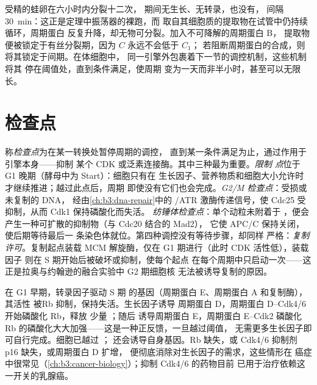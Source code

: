 \begin{example}[蛙卵为何是一个时钟]\label{ex:b3:cell-cycle-apoptosis:frog}
受精的蛙卵在六小时内分裂十二次，
期间无生长、无转录，也没有，
间隔 \qty{30}{min}：这正是定理中振荡器的裸跑，而
取自其细胞质的提取物在试管中仍持续循环，周期蛋白
反复升降，却无物可分裂。加入不可降解的周期蛋白 B，
提取物便被锁定于有丝分裂期，因为 $C$ 永远不会低于 $C_{1}$；
若阻断周期蛋白的合成，则将其锁定于间期。在体细胞中，
同一引擎外包裹着下一节的调控机制，这些机制将其
停在阈值处，直到条件满足，使周期
变为一天而非半小时，甚至可以无限长。
\end{example}

\section{检查点}

\begin{definition}[检查点]\label{def:b3:cell-cycle-apoptosis:checkpoints}
称\emph{检查点}为在某一转换处暂停周期的调控，
直到某一条件满足为止，通过作用于引擎本身——抑制
某个 CDK 或泛素连接酶。其中三种最为重要。\emph{限制
点}位于 G1 晚期（酵母中为 Start）：细胞只有在
生长因子、营养物质和细胞大小允许时才继续推进；越过此点后，周期
即使没有它们也会完成。\emph{G2/M 检查点}：受损或未复制的 DNA，
经由\cref{ch:b3:dna-repair}中的 /ATR 激酶传递信号，使
Cdc25 受抑制，从而 Cdk1 保持磷酸化而失活。
\emph{纺锤体检查点}：单个动粒未附着于
，便会产生一种可扩散的抑制物（与 Cdc20 结合的 Mad2），
它使 APC/C 保持关闭，使后期等待最后一
条染色体就位。第四种调控没有等待步骤，却同样
严格：\emph{复制许可}。复制起点装载 MCM
解旋酶，仅在 G1 期进行（此时 CDK 活性低），装载因子
则在 S 期开始后被破坏或抑制，使每个起点
在每个周期中只启动一次——这正是拉奥与约翰逊的融合实验中 G2 期细胞核
无法被诱导复制的原因。
\end{definition}

\begin{proposition}[限制点是一个开关]\label{prop:b3:cell-cycle-apoptosis:rb}
在 G1 早期，转录因子\emph{}驱动 S 期
的基因（周期蛋白 E、周期蛋白 A 和复制酶），其活性
被\emph{}Rb 抑制，保持失活。生长因子诱导
周期蛋白 D，周期蛋白 D--Cdk4/6 开始磷酸化 Rb，释放
少量 ；随后  诱导周期蛋白 E，周期蛋白 E--Cdk2 磷酸化
Rb 的磷酸化大大加强——这是一种正反馈，一旦越过阈值，
无需更多生长因子即可自行完成。细胞已越过
； 还会诱导自身基因。Rb 缺失，或
Cdk4/6 抑制剂 p16 缺失，或周期蛋白 D 扩增，
便彻底消除对生长因子的需求，这些情形在
癌症中很常见（\cref{ch:b3:cancer-biology}）；抑制 Cdk4/6 的药物目前
已用于治疗依赖这一开关的乳腺癌。
\end{proposition}

